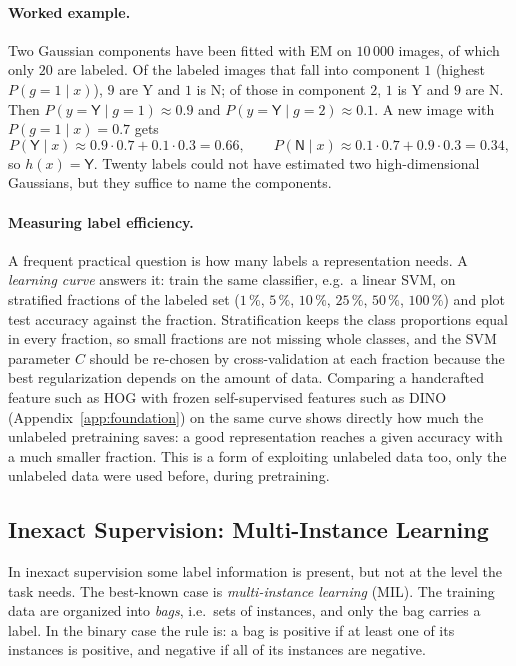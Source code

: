\paragraph{Worked example.}
Two Gaussian components have been fitted with EM on $10\,000$ images, of which
only $20$ are labeled. Of the labeled images that fall into component $1$
(highest $P(g=1\mid x)$), $9$ are \textsf{Y} and $1$ is \textsf{N}; of those
in component $2$, $1$ is \textsf{Y} and $9$ are \textsf{N}. Then
$P(y=\textsf{Y}\mid g=1)\approx0.9$ and $P(y=\textsf{Y}\mid g=2)\approx0.1$.
A new image with $P(g=1\mid x)=0.7$ gets
\begin{equation*}
  P(\textsf{Y}\mid x)\approx 0.9\cdot0.7 + 0.1\cdot0.3 = 0.66,
  \qquad
  P(\textsf{N}\mid x)\approx 0.1\cdot0.7 + 0.9\cdot0.3 = 0.34,
\end{equation*}
so $h(x)=\textsf{Y}$. Twenty labels could not have estimated two
high-dimensional Gaussians, but they suffice to name the components.

\paragraph{Measuring label efficiency.}
A frequent practical question is how many labels a representation needs. A
\emph{learning curve} answers it: train the same classifier, e.g.\ a linear
SVM, on stratified fractions of the labeled set ($1\,\%$, $5\,\%$,
$10\,\%$, $25\,\%$, $50\,\%$, $100\,\%$) and plot test accuracy against the
fraction. Stratification keeps the class proportions equal in every
fraction, so small fractions are not missing whole classes, and the SVM
parameter $C$ should be re-chosen by cross-validation at each fraction
because the best regularization depends on the amount of data. Comparing a
handcrafted feature such as HOG with frozen self-supervised features such as
DINO (Appendix~\ref{app:foundation}) on the same curve shows directly how
much the unlabeled pretraining saves: a good representation reaches a given
accuracy with a much smaller fraction. This is a form of exploiting unlabeled
data too, only the unlabeled data were used before, during pretraining.

\subsection{Inexact Supervision: Multi-Instance Learning}

In inexact supervision some label information is present, but not at the
level the task needs. The best-known case is \emph{multi-instance learning}
(MIL). The training data are organized into \emph{bags}, i.e.\ sets of
instances, and only the bag carries a label. In the binary case the rule is:
a bag is positive if at least one of its instances is positive, and negative
if all of its instances are negative.

